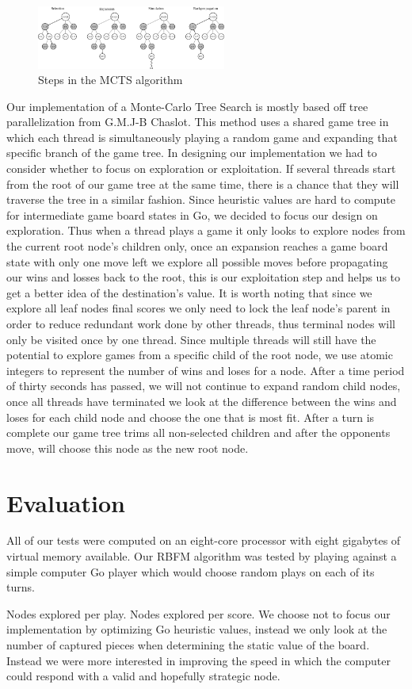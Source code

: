 \documentclass[conference]{IEEEtran}
\begin{document}
\begin{figure}[h]
\includegraphics[width=235px]{MCTS}
\caption{Steps in the MCTS algorithm}
\centering
\end{figure}

Our implementation of a Monte-Carlo Tree Search is mostly based off tree parallelization from G.M.J-B Chaslot. This method uses a shared game tree in which each thread is simultaneously playing a random game and expanding that specific branch of the game tree. In designing our implementation we had to consider whether to focus on exploration or exploitation.  If several threads start from the root of our game tree at the same time, there is a chance that they will traverse the tree in a similar fashion. Since heuristic values are hard to compute for intermediate game board states in Go, we decided to focus our design on exploration. Thus when a thread plays a game it only looks to explore nodes from the current root node's children only, once an expansion reaches a game board state with only one move left we explore all possible moves before propagating our wins and losses back to the root, this is our exploitation step and helps us to get a better idea of the destination's value. It is worth noting that since we explore all leaf nodes final scores we only need to lock the leaf node's parent in order to reduce redundant work done by other threads, thus terminal nodes will only be visited once by one thread. Since multiple threads will still have the potential to explore games from a specific child of the root node, we use atomic integers to represent the number of wins and loses for a node. After a time period of thirty seconds has passed, we will not continue to expand random child nodes, once all threads have terminated we look at the difference between the wins and loses for each child node and choose the one that is most fit. After a turn is complete our game tree trims all non-selected children and after the opponents move, will choose this node as the new root node.

\section{Evaluation}
All of our tests were computed on an eight-core processor with eight gigabytes of virtual memory available. Our RBFM algorithm was tested by playing against a simple computer Go player which would choose random plays on each of its turns.\par
Nodes explored per play.
Nodes explored per score.
We choose not to focus our implementation by optimizing Go heuristic values, instead we only look at the number of captured pieces when determining the static value of the board. Instead we were more interested in improving the speed in which the computer could respond with a valid and hopefully strategic node. 
\end{document}
